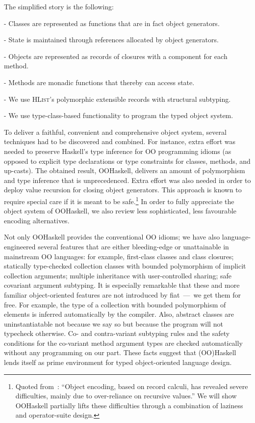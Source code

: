 \documentclass{jfp}
\newcommand{\HList}{\textsc{HList}}
\begin{document}
\medskip

\noindent
The simplified story is the following:

\noindent
- Classes are represented as functions that are in fact object generators.

\noindent
- State is maintained through references allocated by object generators.

\noindent
- Objects are represented as records of closures with a component for each method.

\noindent
- Methods are monadic functions that thereby can access state.

\noindent
- We use \HList's polymorphic extensible records with structural subtyping.

\noindent
- We use type-class-based functionality to program the typed object system.

\medskip

\noindent
To deliver a faithful, convenient and comprehensive object system,
several techniques had to be discovered and combined. For instance,
extra effort was needed to preserve Haskell's type inference for OO
programming idioms (as opposed to explicit type declarations or type
constraints for classes, methods, and up-casts). The obtained result,
OOHaskell, delivers an amount of polymorphism and type inference that
is unprecedenced. Extra effort was also needed in order to deploy
value recursion for closing object generators. This approach is known
to require special care if it is meant to be safe.\footnote{Quoted
from~\cite{ML-ART}: ``Object encoding, based on record calculi, has
revealed severe difficulties, mainly due to over-reliance on recursive
values.'' We will show OOHaskell partially lifts these difficulties
through a combination of laziness and operator-suite design.} In order
to fully appreciate the object system of OOHaskell, we also review
less sophisticated, less favourable encoding alternatives.

Not only OOHaskell provides the conventional OO idioms; we have also
language-engineered several features that are either bleeding-edge or
unattainable in mainstream OO languages: for example, first-class
classes and class closures; statically type-checked collection classes
with bounded polymorphism of implicit collection arguments; multiple
inheritance with user-controlled sharing; safe covariant argument
subtyping. It is especially remarkable that these and more familiar
object-oriented features are not introduced by fiat~---~we get them
for free. For example, the type of a collection with bounded
polymorphism of elements is inferred automatically by the
compiler. Also, abstract classes are uninstantiatable not because we
say so but because the program will not typecheck otherwise. Co- and
contra-variant subtyping rules and the safety conditions for the
co-variant method argument types are checked automatically without any
programming on our part. These facts suggest that (OO)Haskell lends
itself as prime environment for typed object-oriented language design.
\end{document}
